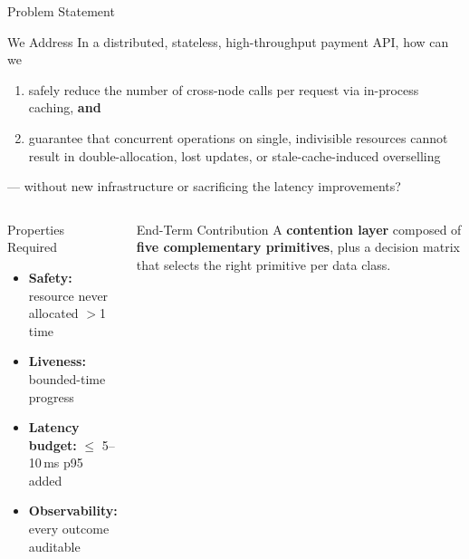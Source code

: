 \documentclass[aspectratio=169,xcolor=dvipsnames,9pt]{beamer}
\begin{document}
\begin{frame}{Problem Statement}
\begin{block}{We Address}
  \footnotesize
  In a distributed, stateless, high-throughput payment API, how can we
  \begin{enumerate}
    \item safely reduce the number of cross-node calls per request via in-process caching, \textbf{and}
    \item guarantee that concurrent operations on single, indivisible resources cannot result in double-allocation, lost updates, or stale-cache-induced overselling
  \end{enumerate}
  --- without new infrastructure or sacrificing the latency improvements?
\end{block}
\vspace{0.4em}
\begin{columns}[T]
  \begin{exampleblock}{Properties Required}
    \footnotesize
    \begin{itemize}
      \item \textbf{Safety:} resource never allocated $>$1 time
      \item \textbf{Liveness:} bounded-time progress
      \item \textbf{Latency budget:} $\le$ 5--10\,ms p95 added
      \item \textbf{Observability:} every outcome auditable
    \end{itemize}
  \end{exampleblock}
  \begin{alertblock}{End-Term Contribution}
    \footnotesize
    A \textbf{contention layer} composed of \textbf{five complementary primitives}, plus a decision matrix that selects the right primitive per data class.
  \end{alertblock}
\end{columns}
\end{frame}
\end{document}
